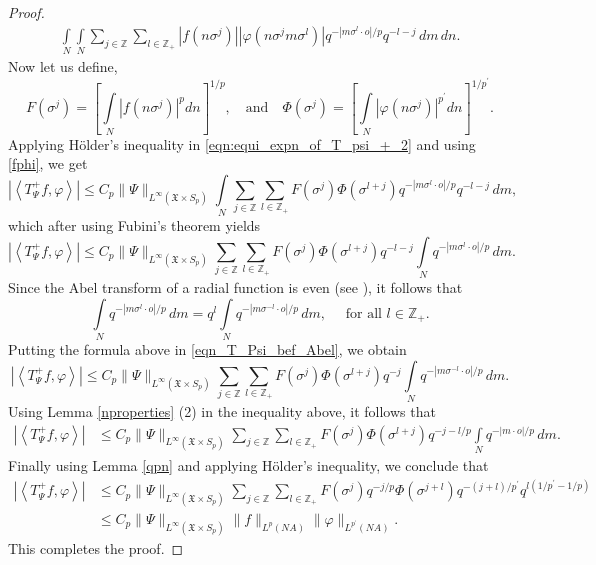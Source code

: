 \documentclass[12pt,reqno]{amsart}
\newcommand{\Z}{\mathbb Z}%
\theoremstyle{definition}
\theoremstyle{definition}
\numberwithin{equation}{section}
\begin{document}
\begin{proof}
\begin{multline}
 \int\limits_{N}\int\limits_{N}\sum\limits_{j\in\mathbb{Z} } \sum\limits_{l\in\mathbb{Z}_+ }   |f(n\sigma^{j}) |  |\varphi(n\sigma^jm \sigma^{l})|  q^{-|m \sigma^{l}\cdot o|/p}q^{-l-j} \,dm\,dn.
\end{multline}
Now let us define,
	\begin{equation}\label{fphi}
			F(\sigma^j) =  \left[\int\limits_{N} \left|f(n\sigma^j)\right|^p dn  \right]^{1/p}, \quad \text{and} \quad
			\varPhi(\sigma^j) =  \left[\int\limits_{N} \left|\varphi(n\sigma^j)\right|^{p^\prime} dn  \right]^{1/p^\prime}.
	\end{equation}
Applying H\"older's inequality in \eqref{eqn:equi_expn_of_T_psi_+_2} and using \eqref{fphi}, we get
$$\left|	\left\langle T_{\Psi}^{+}f, \varphi\right\rangle\right|\leq C_{p} \| \Psi\|_{L^\infty(\mathfrak{X}\times S_p)}    \int\limits_{N} \sum\limits_{j\in\mathbb{Z} } \sum\limits_{l\in\mathbb{Z}_+ }   F(\sigma^{j})   \varPhi(\sigma^{l+j})  q^{-|m \sigma^{l}\cdot o|/p}q^{-l-j}\,dm,$$
which after using Fubini's theorem  yields
\begin{equation}\label{eqn_T_Psi_bef_Abel}
	\left|	\left\langle T_{\Psi}^{+}f, \varphi\right\rangle\right|\leq C_{p} \| \Psi\|_{L^\infty(\mathfrak{X}\times S_p)}     \sum\limits_{j\in\mathbb{Z} } \sum\limits_{l \in \Z_+ }   F(\sigma^{j})   \varPhi(\sigma^{l+j})  q^{-l-j} \int\limits_{N}q^{-|m \sigma^{l}\cdot o|/p} \, dm.
\end{equation}
Since the Abel transform of a radial function is even (see \cite[Theorem 2.5]{Cowling_Meda_98}), it follows that  
$$\int\limits_{N}q^{-|m \sigma^{l}\cdot o|/p} \, dm= q^{l} \int\limits_{N}q^{-|m \sigma^{-l}\cdot o|/p} \, dm, \quad \text{ for all } l\in \Z_+.$$
Putting  the formula above in \eqref{eqn_T_Psi_bef_Abel}, we obtain
$$\left|	\left\langle T_{\Psi}^{+}f, \varphi\right\rangle\right| \leq C_{p} \| \Psi\|_{L^\infty(\mathfrak{X}\times S_p)}    \sum\limits_{j\in\mathbb{Z} } \sum\limits_{l \in \Z_+ }   F(\sigma^{j})   \varPhi(\sigma^{l+j})   q^{-j} \int\limits_{N}q^{-|m \sigma^{-l}\cdot o|/p} \, dm.$$
Using Lemma \ref{nproperties} (2) in the inequality above, it follows that
\begin{align*}
		\left|	\left\langle T_{\Psi}^{+}f, \varphi\right\rangle\right|  	& \leq C_{p} \| \Psi\|_{L^\infty(\mathfrak{X}\times S_p)}     \sum\limits_{j\in\mathbb{Z} } \sum\limits_{l \in \Z_+}   F(\sigma^{j})   \varPhi(\sigma^{l+j})   q^{-j-l/p} \int\limits_{N}q^{-|m \cdot o|/p} \,dm.
\end{align*}
Finally using Lemma \ref{qpn} and applying H\"older's inequality, we conclude that
\begin{align*}
\left|	\left\langle T_{\Psi}^{+}f, \varphi\right\rangle\right|  	& \leq C_{p} \| \Psi\|_{L^\infty(\mathfrak{X}\times S_p)}     \sum\limits_{j\in\mathbb{Z} } \sum\limits_{l \in \Z_+}   F(\sigma^{j})q^{-j/p}   \varPhi(\sigma^{j+l})   q^{-(j+l)/p^\prime}  q^{l(1/p^\prime-1/p)}\\
&\leq C_{p} \| \Psi\|_{L^\infty(\mathfrak{X}\times S_p)}   \|f\|_{L^p(NA)} \|\varphi\|_{L^{p^{\prime}}(NA)}.
\end{align*}
This completes the proof.
\end{proof}
\end{document}

